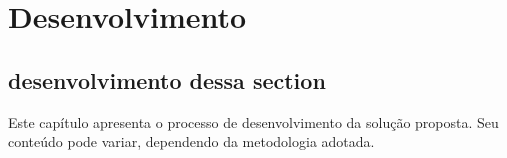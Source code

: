 	\newpage
\chapter{Desenvolvimento}
\label{ch:desenvolvimento}

\section{desenvolvimento dessa section}
\par Este capítulo apresenta o processo de desenvolvimento da solução proposta. Seu conteúdo pode variar, dependendo da metodologia adotada.